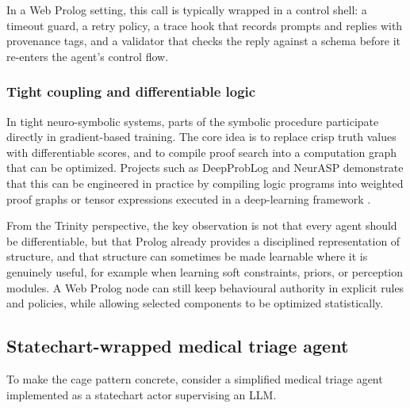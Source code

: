 \noindent In a Web Prolog setting, this call is typically wrapped in a control shell: a timeout guard, a retry policy, a trace hook that records prompts and replies with provenance tags, and a validator that checks the reply against a schema before it re-enters the agent's control flow.

\subsubsection{Tight coupling and differentiable logic}

In tight neuro-symbolic systems, parts of the symbolic procedure participate directly in gradient-based training. The core idea is to replace crisp truth values with differentiable scores, and to compile proof search into a computation graph that can be optimized. Projects such as DeepProbLog and NeurASP demonstrate that this can be engineered in practice by compiling logic programs into weighted proof graphs or tensor expressions executed in a deep-learning framework \cite{DeepProbLog,NeurASP}.

From the Trinity perspective, the key observation is not that every agent should be differentiable, but that Prolog already provides a disciplined representation of structure, and that structure can sometimes be made learnable where it is genuinely useful, for example when learning soft constraints, priors, or perception modules. A Web Prolog node can still keep behavioural authority in explicit rules and policies, while allowing selected components to be optimized statistically.

\subsection{Statechart-wrapped medical triage agent}
\label{sec:statechart-wrapped-triage}

To make the cage pattern concrete, consider a simplified medical triage agent implemented as a statechart actor supervising an LLM.

